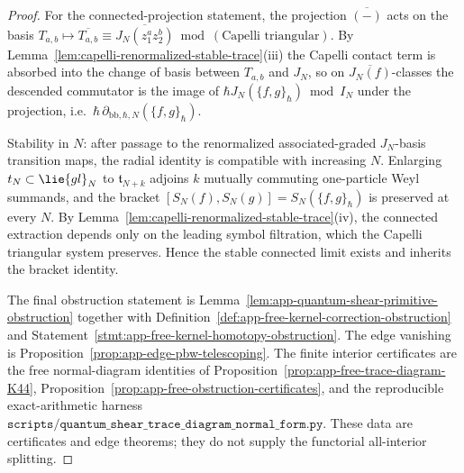 \documentclass[11pt]{memoir}
\begin{document}
\begin{proof}
  For the connected-projection statement, the projection
  $\overline{(-)}$ acts on the basis
  $T_{a,b}\mapsto\overline{T_{a,b}}\equiv
   \overline{J_N(z_1^az_2^b)}\bmod(\text{Capelli triangular})$.
  By Lemma~\ref{lem:capelli-renormalized-stable-trace}(iii) the Capelli
  contact term is absorbed into the change of basis between $T_{a,b}$ and
  $J_N$, so on $\overline{J_N(f)}$-classes the descended commutator is
  the image of $\hbar J_N(\{f,g\}_\hbar)\bmod I_N$ under the projection,
  i.e.\ $\hbar\,\partial_{\mathrm{bb},\hbar,N}(\{f,g\}_\hbar)$.

  Stability in $N$: after passage to the renormalized associated-graded
  \(J_N\)-basis transition maps, the radial identity is compatible with
  increasing \(N\). Enlarging
  $\mathfrak t_N\subset\lie{gl}_N$ to $\mathfrak t_{N+k}$ adjoins $k$
  mutually commuting one-particle Weyl summands, and the bracket
  $[S_N(f),S_N(g)]=S_N(\{f,g\}_\hbar)$ is preserved at every $N$. By
  Lemma~\ref{lem:capelli-renormalized-stable-trace}(iv), the connected
  extraction depends only on the leading symbol filtration, which the
  Capelli triangular system preserves. Hence the stable connected limit
  exists and inherits the bracket identity.

  The final obstruction statement is
  Lemma~\ref{lem:app-quantum-shear-primitive-obstruction} together with
  Definition~\ref{def:app-free-kernel-correction-obstruction} and
  Statement~\ref{stmt:app-free-kernel-homotopy-obstruction}.  The edge
  vanishing is Proposition~\ref{prop:app-edge-pbw-telescoping}.  The
  finite interior certificates are the free normal-diagram identities of
  Proposition~\ref{prop:app-free-trace-diagram-K44},
  Proposition~\ref{prop:app-free-obstruction-certificates}, and the
  reproducible exact-arithmetic harness
  \(\texttt{scripts/quantum\_shear\_trace\_diagram\_normal\_form.py}\).
  These data are certificates and edge theorems; they do not supply the
  functorial all-interior splitting.
\end{proof}
\end{document}
